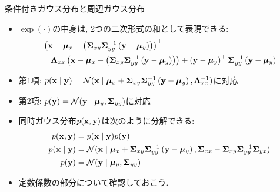 \documentclass[dvipdfmx,notheorems,t]{beamer}
\begin{document}
\begin{frame}{条件付きガウス分布と周辺ガウス分布}
\begin{itemize}
  \item $\exp(\cdot)$の中身は, 2つの二次形式の和として表現できる:
  \begin{align*}
    & \left( \vb{x} - \vb*{\mu}_x - \left( \vb{\Sigma}_{xy} \vb{\Sigma}_{yy}^{-1}
      \left( \vb{y} - \vb*{\mu}_y \right) \right) \right)^\top \\
    & \quad \vb{\Lambda}_{xx}
      \left( \vb{x} - \vb*{\mu}_x - \left( \vb{\Sigma}_{xy} \vb{\Sigma}_{yy}^{-1}
      \left( \vb{y} - \vb*{\mu}_y \right) \right) \right)
      + \left( \vb{y} - \vb*{\mu}_y \right)^\top \vb{\Sigma}_{yy}^{-1}
      \left( \vb{y} - \vb*{\mu}_y \right)
  \end{align*}
  \item 第1項: $p(\vb{x} \mid \vb{y}) = \mathcal{N}(\vb{x} \mid \vb*{\mu}_x
  + \vb{\Sigma}_{xy} \vb{\Sigma}_{yy}^{-1} \left( \vb{y} - \vb*{\mu}_y \right), \vb{\Lambda}_{xx}^{-1})$に対応
  \item 第2項: $p(\vb{y}) = \mathcal{N}(\vb{y} \mid \vb*{\mu}_y, \vb{\Sigma}_{yy})$に対応
  \item 同時ガウス分布$p(\vb{x}, \vb{y})$は次のように分解できる:
  \begin{align*}
    p(\vb{x}, \vb{y}) &= p(\vb{x} \mid \vb{y}) p(\vb{y}) \\
    p(\vb{x} \mid \vb{y}) &= \mathcal{N}(\vb{x} \mid \vb*{\mu}_x
      + \vb{\Sigma}_{xy} \vb{\Sigma}_{yy}^{-1} \left( \vb{y} - \vb*{\mu}_y \right),
      \vb{\Sigma}_{xx} - \vb{\Sigma}_{xy} \vb{\Sigma}_{yy}^{-1} \vb{\Sigma}_{yx}) \\
    p(\vb{y}) &= \mathcal{N}(\vb{y} \mid \vb*{\mu}_y, \vb{\Sigma}_{yy})
  \end{align*}
  \item 定数係数の部分について確認しておこう.
\end{itemize}
\end{frame}
\end{document}

